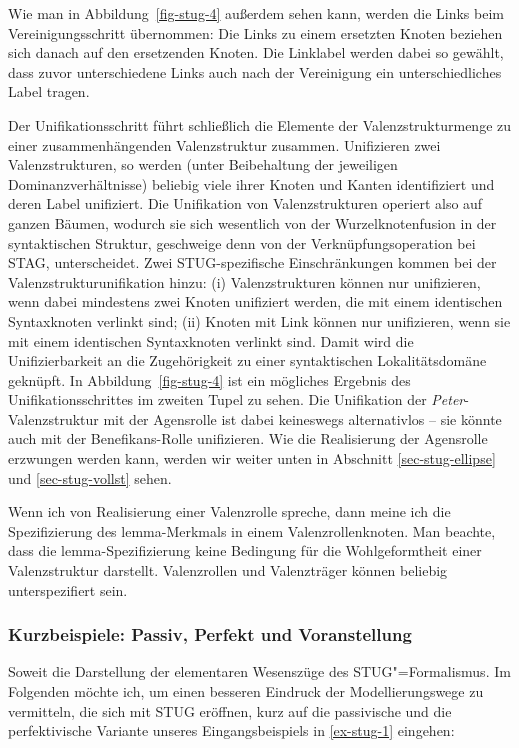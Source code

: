 Wie man in Abbildung~\ref{fig-stug-4} au\ss erdem sehen kann, werden die Links beim Vereinigungsschritt übernommen: Die Links zu einem ersetzten Knoten beziehen sich danach auf den ersetzenden Knoten. Die Linklabel werden dabei so gewählt, dass zuvor unterschiedene Links auch nach der Vereinigung ein unterschiedliches Label tragen. 

Der Unifikationsschritt führt schlie\ss lich die Elemente der Valenzstrukturmenge zu einer zusammenhängenden Valenzstruktur zusammen. Unifizieren zwei Valenzstrukturen, so werden (unter Beibehaltung der jeweiligen Dominanzverhältnisse) beliebig viele ihrer Knoten und Kanten identifiziert und deren Label unifiziert. Die Unifikation von Valenzstrukturen operiert also auf ganzen Bäumen, wodurch sie sich wesentlich von der Wurzelknotenfusion in der syntaktischen Struktur, geschweige denn von der Verknüpfungsoperation bei STAG, unterscheidet. Zwei STUG-spezifische Einschränkungen kommen bei der Valenzstrukturunifikation hinzu: (i) Valenzstrukturen können nur unifizieren, wenn dabei mindestens zwei Knoten unifiziert werden, die mit einem identischen Syntaxknoten verlinkt sind; (ii) Knoten mit Link können nur unifizieren, wenn sie mit einem identischen Syntaxknoten verlinkt sind. Damit wird die Unifizierbarkeit an die Zugehörigkeit zu einer syntaktischen Lokalitätsdomäne geknüpft. In Abbildung~\ref{fig-stug-4} ist ein mögliches Ergebnis des Unifikationsschrittes im zweiten Tupel zu sehen. Die Unifikation der {\it Peter}-Valenzstruktur mit der Agensrolle ist dabei keineswegs alternativlos -- sie könnte auch mit der Benefikans-Rolle unifizieren. Wie die Realisierung der Agensrolle erzwungen werden kann, werden wir weiter unten in Abschnitt \ref{sec-stug-ellipse} und \ref{sec-stug-vollst} sehen.

Wenn ich von Realisierung einer Valenzrolle spreche, dann meine ich die Spezifizierung des {\sc lemma}-Merkmals in einem Valenzrollenknoten. Man beachte, dass die {\sc lemma}-Spezifizie\-rung keine Bedingung für die Wohlgeformtheit einer Valenzstruktur darstellt. Valenzrollen und Valenzträger können beliebig unterspezifiert sein.

\clearpage 

\subsubsection*{Kurzbeispiele: Passiv, Perfekt und Voranstellung}

Soweit die Darstellung der elementaren Wesenszüge des STUG"=Formalismus. Im Folgenden möchte ich, um einen besseren Eindruck der Modellierungswege zu vermitteln, die sich mit STUG eröffnen, kurz auf die passivische und die perfektivische Variante unseres Eingangsbeispiels in \ref{ex-stug-1} eingehen:

